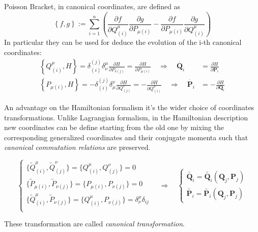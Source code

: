 \begin{enumerate}
    Poisson Bracket, in canonical coordinates, are defined as
    \begin{equation*} \label{eq:possion_braket}
      \left\{ f, g \right\} := \sum_{i=1}^{n} \left(
        \frac{\partial f}{\partial Q^{\mu}_{(i)}}
        \frac{\partial g}{\partial P_{\mu(i)}} -
        \frac{\partial f}{\partial P_{\mu(i)}}
        \frac{\partial g}{\partial Q^{\mu}_{(i)}}
      \right)
    \end{equation*}
    In particular they can be used for deduce the evolution of the i-th
    canonical coordinates:
    \begin{align*}
      \left\{ Q^{\mu}_{(i)}, H\right\}
      = \delta^{(j)}_{(i)} \delta^{\mu}_{\nu}
          \frac{\partial H}{\partial P_{\nu(j)}}
      = \frac{\partial H}{\partial P_{\mu(i)}}
      \quad \Rightarrow \quad
      \dot{\bm{Q}_i} &=  \frac{\partial H}{\partial \bm{P}_i}
      \\
      \left\{ P_{\mu(i)}, H\right\}
      = - \delta^{(j)}_{(i)} \delta^{\nu}_{\mu}
          \frac{\partial H}{\partial Q^{\nu}_{(j)}}
      = - \frac{\partial H}{\partial Q^{\mu}_{(i)}}
      \quad \Rightarrow \quad
      \dot{\bm{P}_i} &= -\frac{\partial H}{\partial \bm{Q}_i}
    \end{align*}
\end{enumerate}
An advantage on the Hamiltonian formalism it's the wider choice of coordinates
transformations. Unlike Lagrangian formalism, in the Hamiltonian description new
coordinates can be define starting from the old one by mixing the corresponding
generalized coordinates and their conjugate momenta such that \emph{canonical
commutation relations} are preserved.

\begin{equation} \label{eq:canonical_transformation}
  \begin{cases}
    \{\tilde{Q}^{\mu}_{(i)}, \tilde{Q}^{\nu}_{(j)}\} =
    \{Q^{\mu}_{(i)}, Q^{\nu}_{(j)}\} = 0 \\
    \{\tilde{P}_{\mu(i)}, \tilde{P}_{\nu(j)}\} =
    \{P_{\mu(i)}, P_{\nu(j)}\} = 0 \\
    \{\tilde{Q}^{\mu}_{(i)}, \tilde{P}_{\nu(j)}\} =
    \{Q^{\mu}_{(i)}, P_{\nu(j)}\} = \delta^{\mu}_{\nu} \delta_{ij}\\
  \end{cases}
  \quad \Rightarrow \quad
  \begin{cases}
    \tilde{\bm{Q}_i} = \tilde{\bm{Q}_i}(\bm{Q}_j, \bm{P}_j) \\
    \tilde{\bm{P}_i} = \tilde{\bm{P}_i}(\bm{Q}_j, \bm{P}_j)
  \end{cases}
\end{equation}

These transformation are called \emph{canonical transformation}.
